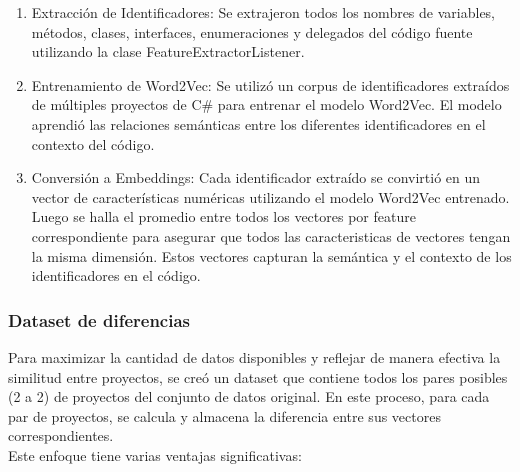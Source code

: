 \begin{enumerate}
	\item Extracción de Identificadores: Se extrajeron todos los nombres de variables, métodos, clases, interfaces, enumeraciones y delegados del código fuente utilizando la clase FeatureExtractorListener.
	
	\item Entrenamiento de Word2Vec: Se utilizó un corpus de identificadores extraídos de múltiples proyectos de C\# para entrenar el modelo Word2Vec. El modelo aprendió las relaciones semánticas entre los diferentes identificadores en el contexto del código.
	
	\item Conversión a Embeddings: Cada identificador extraído se convirtió en un vector de características numéricas utilizando el modelo Word2Vec entrenado. Luego se halla el promedio entre todos los vectores por feature correspondiente para asegurar que todos las caracteristicas de vectores tengan la misma dimensión. Estos vectores capturan la semántica y el contexto de los identificadores en el código.
	 
\end{enumerate}

\subsubsection{Dataset de diferencias}
Para maximizar la cantidad de datos disponibles y reflejar de manera efectiva la similitud entre proyectos, se creó un dataset que contiene todos los pares posibles (2 a 2) de proyectos del conjunto de datos original. En este proceso, para cada par de proyectos, se calcula y almacena la diferencia entre sus vectores correspondientes.\\

Este enfoque tiene varias ventajas significativas:

